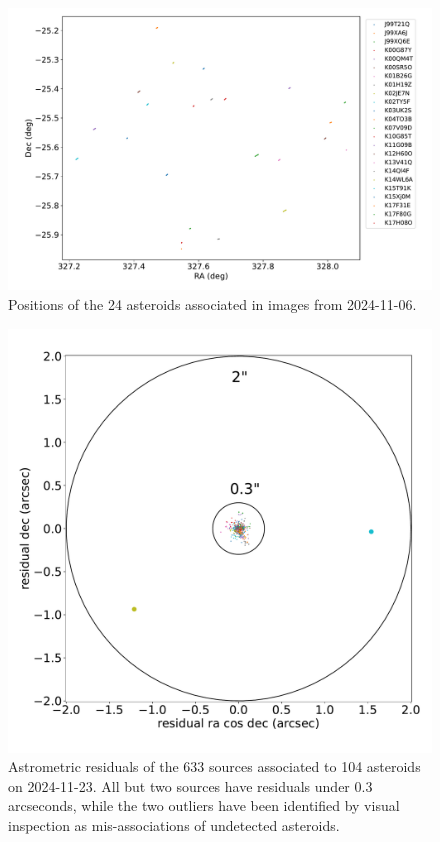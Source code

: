 \begin{figure}
  \includegraphics[width=\textwidth]{sso_figures/24_asteroids.pdf}
  \caption{Positions of the 24 asteroids associated in images from 2024-11-06.}
  \label{fig:solar_system_positions}
\end{figure}

\begin{figure}
  \includegraphics[width=\textwidth]{sso_figures/sso_residuals.pdf}
  \caption{Astrometric residuals of the 633 sources associated to 104 asteroids on 2024-11-23. All but two sources have residuals under 0.3 arcseconds, while the two outliers have been identified by visual inspection as mis-associations of undetected asteroids.}
  \label{fig:solar_system_residuals}
\end{figure}

